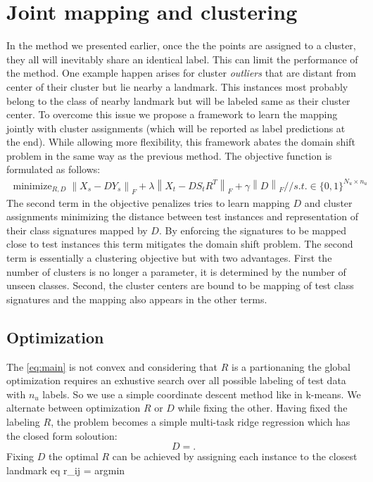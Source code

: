 \documentclass[wcp]{jmlr}
\newcommand{\norm}[1]{\left \lVert #1 \right \rVert_{F}}
\DeclareMathOperator*{\minimize}{minimize}
\begin{document}
\section{Joint mapping and clustering}
In the method we presented earlier, once the the points are assigned to a cluster,
they all will inevitably share an identical label. This can limit the performance of the method. One
example happen arises for cluster \textit{outliers} that are distant from center of their cluster but lie
nearby a landmark. This instances most probably belong to the class of nearby landmark but will be labeled same
as their cluster center. To overcome this issue we propose a framework to learn the mapping jointly with cluster assignments
 (which will be reported as label predictions at the end).
 While allowing more flexibility, this framework abates the domain shift problem in the same way as the previous method.
 The objective function is formulated as follows:
 \begin{align} \label{eq:main}
   \minimize_{R,D} \norm{X_s - D Y_s}  + \lambda \norm{X_t - D S_t R^T } + \gamma \norm{D} //
   s.t. \in \{0,1\}^{N_u \times n_u}
 \end{align}
 The second term in the objective penalizes tries to learn mapping $D$ and cluster assignments minimizing the
 distance between test instances and representation of their class signatures mapped by $D$. By enforcing
 the signatures to be mapped close to test instances this term mitigates the domain shift problem.
 The second term is essentially a clustering objective but with two advantages. First the number of clusters is no longer a
 parameter, it is determined by the number of unseen classes. Second, the cluster centers are bound to be
 mapping of test class signatures and the mapping also appears in the other terms.

\subsection{Optimization}
The \eqref{eq:main} is not convex and considering that $R$ is a partionaning the global optimization requires an 
exhustive search over all possible labeling of test data with $n_u$ labels. So we use a simple coordinate descent 
method like in k-means. We alternate between optimization $R$ or $D$ while fixing the other. 
Having fixed the labeling $R$, the problem becomes a simple multi-task ridge regression which has the closed form soloution:
\begin{equation}
  D = .
\end{equation}
Fixing $D$ the optimal $R$ can be achieved by assigning each instance to the closest landmark
eq r_ij = argmin
\end{document}
